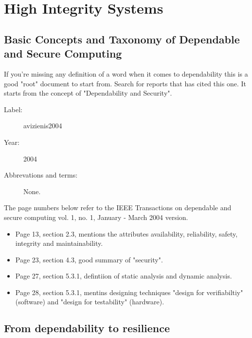 \chapter{High Integrity Systems}

\section{Basic Concepts and Taxonomy of Dependable and Secure Computing}

If you're missing any definition of a word when it comes to dependability this
is a good "root" document to start from. Search for reports that has cited this
one. It starts from the concept of "Dependability and Security".

\begin{description}
    \item[Label:] avizienis2004 \cite{avizienis2004}
    \item[Year:] 2004
    \item[Abbrevations and terms:] None.
\end{description}

The page numbers below refer to the IEEE Transactions on dependable and secure
computing vol. 1, no. 1, January - March 2004 version.
\begin{itemize}
    \item Page 13, section 2.3, mentions the attributes availability,
        reliability, safety, integrity and maintainability.
    \item Page 23, section 4.3, good summary of "security".
    \item Page 27, section 5.3.1, defintiion of static analysis and dynamic
        analysis.
    \item Page 28, section 5.3.1, mentins designing techniques "design for
        verifiabiltiy" (software) and "design for testability" (hardware).
\end{itemize}

\section{From dependability to resilience}

